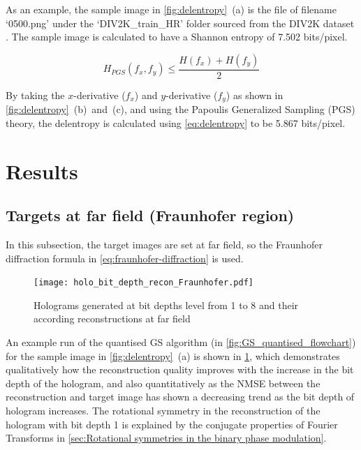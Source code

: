 	As an example, the sample image in \cref{fig:delentropy}~(a) is the file of filename `0500.png' under the `DIV2K\_train\_HR' folder sourced from the DIV2K dataset \cite{Agustsson2017}. The sample image is calculated to have a Shannon entropy of 7.502 bits/pixel.

	\begin{equation}
		H_{PGS}(f_x, f_y) \leq \frac{H(f_x) + H(f_y)}{2}
		\label{eq:delentropy}
	\end{equation}

	By taking the $x$-derivative ($f_x$) and $y$-derivative ($f_y$) as shown in \cref{fig:delentropy}~(b)~and~(c), and using the Papoulis Generalized Sampling (PGS) \cite{Papoulis1977} theory, the delentropy is calculated using \cref{eq:delentropy}\cite{Larkin2016} to be 5.867 bits/pixel.




\section{Results}
\subsection{Targets at far field (Fraunhofer region)} \label{sec:Fraunhofer_results}
	In this subsection, the target images are set at far field, so the Fraunhofer diffraction formula in \cref{eq:fraunhofer-diffraction} is used.

	\begin{figure} [H]
	   \begin{center}
	   \texttt{[image: holo\_bit\_depth\_recon\_Fraunhofer.pdf]}
	   \end{center}
	   \caption{\label{fig:holo_bit_depth_recon_Fraunhofer} Holograms generated at bit depths level from 1 to 8 and their according reconstructions at far field}
	\end{figure}

	An example run of the quantised GS algorithm (in \cref{fig:GS_quantised_flowchart}) for the sample image in \cref{fig:delentropy}~(a) is shown in \cref{fig:holo_bit_depth_recon_Fraunhofer}, which demonstrates qualitatively how the reconstruction quality improves with the increase in the bit depth of the hologram, and also quantitatively as the NMSE between the reconstruction and target image has shown a decreasing trend as the bit depth of hologram increases. The rotational symmetry in the reconstruction of the hologram with bit depth 1 is explained by the conjugate properties of Fourier Transforms in \cref{sec:Rotational symmetries in the binary phase modulation}.

